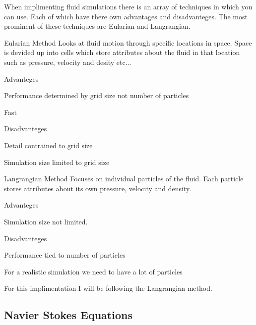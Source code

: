 When implimenting fluid simulations there is an array of techniques in which you can use. Each of which have there own advantages and disadvanteges. The most prominent of these techniques are Eularian and Langrangian.
\begin{DoxyItemize}
\item Eularian Method Looks at fluid motion through specific locations in space. Space is devided up into cells which store attributes about the fluid in that location such as pressure, velocity and desity etc...
\begin{DoxyItemize}
\item Advanteges
\begin{DoxyItemize}
\item Performance determined by grid size not number of particles
\item Fast
\end{DoxyItemize}
\item Disadvanteges
\begin{DoxyItemize}
\item Detail contrained to grid size
\item Simulation size limited to grid size
\end{DoxyItemize}
\end{DoxyItemize}
\item Langrangian Method Focuses on individual particles of the fluid. Each particle stores attributes about its own pressure, velocity and density.
\begin{DoxyItemize}
\item Advanteges
\begin{DoxyItemize}
\item Simulation size not limited.
\end{DoxyItemize}
\item Disadvanteges
\begin{DoxyItemize}
\item Performance tied to number of particles
\item For a realistic simulation we need to have a lot of particles
\end{DoxyItemize}
\end{DoxyItemize}
\end{DoxyItemize}

For this implimentation I will be following the Langrangian method.

\subsection*{Navier Stokes Equations }

